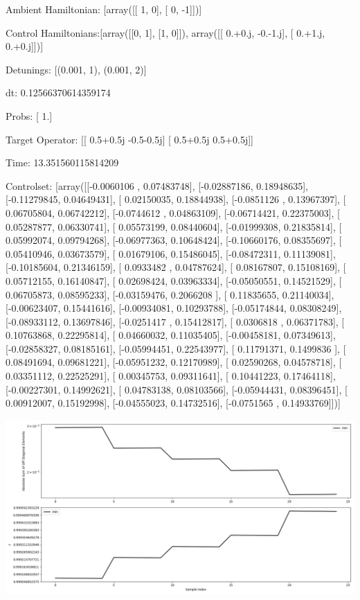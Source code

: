 \documentclass{article}
\begin{document}
    

\newpage

Ambient Hamiltonian: [array([[ 1,  0],
       [ 0, -1]])]

Control Hamiltonians:[array([[0, 1],
       [1, 0]]), array([[ 0.+0.j, -0.-1.j],
       [ 0.+1.j,  0.+0.j]])]

Detunings: [(0.001, 1), (0.001, 2)]

 dt: 0.12566370614359174

Probs: [ 1.]

Target Operator: [[ 0.5+0.5j -0.5-0.5j]
 [ 0.5+0.5j  0.5+0.5j]]

Time: 13.351560115814209

Controlset: [array([[-0.0060106 ,  0.07483748],
       [-0.02887186,  0.18948635],
       [-0.11279845,  0.04649431],
       [ 0.02150035,  0.18844938],
       [-0.0851126 ,  0.13967397],
       [ 0.06705804,  0.06742212],
       [-0.0744612 ,  0.04863109],
       [-0.06714421,  0.22375003],
       [ 0.05287877,  0.06330741],
       [ 0.05573199,  0.08440604],
       [-0.01999308,  0.21835814],
       [ 0.05992074,  0.09794268],
       [-0.06977363,  0.10648424],
       [-0.10660176,  0.08355697],
       [ 0.05410946,  0.03673579],
       [ 0.01679106,  0.15486045],
       [-0.08472311,  0.11139081],
       [-0.10185604,  0.21346159],
       [ 0.0933482 ,  0.04787624],
       [ 0.08167807,  0.15108169],
       [ 0.05712155,  0.16140847],
       [ 0.02698424,  0.03963334],
       [-0.05050551,  0.14521529],
       [ 0.06705873,  0.08595233],
       [-0.03159476,  0.2066208 ],
       [ 0.11835655,  0.21140034],
       [-0.00623407,  0.15441616],
       [-0.00934081,  0.10293788],
       [-0.05174844,  0.08308249],
       [-0.08933112,  0.13697846],
       [-0.0251417 ,  0.15412817],
       [ 0.0306818 ,  0.06371783],
       [ 0.10763868,  0.22295814],
       [ 0.04660032,  0.11035405],
       [-0.00458181,  0.07349613],
       [-0.02858327,  0.08185161],
       [-0.05994451,  0.22543977],
       [ 0.11791371,  0.1499836 ],
       [ 0.08491694,  0.09681221],
       [-0.05951232,  0.12170989],
       [ 0.02590268,  0.04578718],
       [ 0.03351112,  0.22525291],
       [ 0.00345753,  0.09311641],
       [ 0.10441223,  0.17464118],
       [-0.00227301,  0.14992621],
       [ 0.04783138,  0.08103566],
       [-0.05944431,  0.08396451],
       [ 0.00912007,  0.15192998],
       [-0.04555023,  0.14732516],
       [-0.0751565 ,  0.14933769]])]
\begin{center}
\includegraphics[scale=.9]{report_pickled_controls189/control_dpn_all.png}

\end{center}
\end{document}
